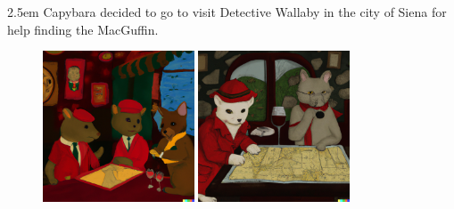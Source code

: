 \documentclass{article}
\newcommand{\imagewidthfactor}{0.4}
\newcommand{\addmarginA}{2.5em}
\newcommand{\addmarginB}{2.5em}
\begin{document}
\begin{addmargin}[\addmarginA]{\addmarginB}
Capybara decided to go to visit Detective Wallaby in the city of Siena for help
finding the MacGuffin.
\end{addmargin}

\newpage %

\begin{figure}[h!]
\centering
\includegraphics[width=\imagewidthfactor\textwidth]{media/4a.png}
\quad
\includegraphics[width=\imagewidthfactor\textwidth]{media/4b.png}\\

\end{figure}
\end{document}
